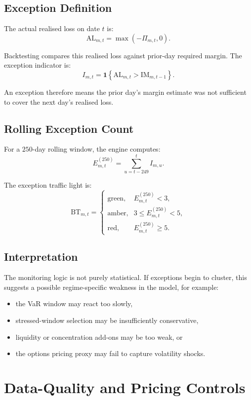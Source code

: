\documentclass[11pt]{article}
\begin{document}
\subsection{Exception Definition}

The actual realised loss on date \(t\) is:
\[
\text{AL}_{m,t} = \max(-\Pi_{m,t}, 0).
\]

Backtesting compares this realised loss against prior-day required margin. The exception indicator is:
\[
I_{m,t}
=
\mathbf{1}\left\{
\text{AL}_{m,t} > \text{IM}_{m,t-1}
\right\}.
\]

An exception therefore means the prior day's margin estimate was not sufficient to cover the next day's realised loss.

\subsection{Rolling Exception Count}

For a \(250\)-day rolling window, the engine computes:
\[
E_{m,t}^{(250)}
=
\sum_{u=t-249}^{t} I_{m,u}.
\]

The exception traffic light is:
\[
\text{BT}_{m,t}
=
\begin{cases}
\text{green}, & E_{m,t}^{(250)} < 3,\\
\text{amber}, & 3 \le E_{m,t}^{(250)} < 5,\\
\text{red}, & E_{m,t}^{(250)} \ge 5.
\end{cases}
\]

\subsection{Interpretation}

The monitoring logic is not purely statistical. If exceptions begin to cluster, this suggests a possible regime-specific weakness in the model, for example:

\begin{itemize}
    \item the VaR window may react too slowly,
    \item stressed-window selection may be insufficiently conservative,
    \item liquidity or concentration add-ons may be too weak, or
    \item the options pricing proxy may fail to capture volatility shocks.
\end{itemize}

\section{Data-Quality and Pricing Controls}
\end{document}
